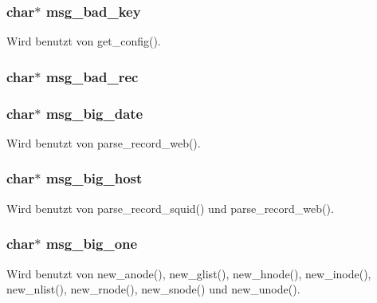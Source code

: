 \subsubsection{\setlength{\rightskip}{0pt plus 5cm}char$\ast$ {\bf msg\_\-bad\_\-key}}\label{lang_8h_677f59db55311afd2a3a860c1e36e004}




Wird benutzt von get\_\-config().
\subsubsection{\setlength{\rightskip}{0pt plus 5cm}char$\ast$ {\bf msg\_\-bad\_\-rec}}\label{lang_8h_bc0778be3e6f0173eda81a2a70e97fee}


\subsubsection{\setlength{\rightskip}{0pt plus 5cm}char$\ast$ {\bf msg\_\-big\_\-date}}\label{lang_8h_5cf2461dfbe62c32f225953b0326462c}




Wird benutzt von parse\_\-record\_\-web().
\subsubsection{\setlength{\rightskip}{0pt plus 5cm}char$\ast$ {\bf msg\_\-big\_\-host}}\label{lang_8h_6ce7f8ad0ab920f3113dff9e936dc9a5}




Wird benutzt von parse\_\-record\_\-squid() und parse\_\-record\_\-web().
\subsubsection{\setlength{\rightskip}{0pt plus 5cm}char$\ast$ {\bf msg\_\-big\_\-one}}\label{lang_8h_a2ee47975118e6f57ce4a10d1baeef26}




Wird benutzt von new\_\-anode(), new\_\-glist(), new\_\-hnode(), new\_\-inode(), new\_\-nlist(), new\_\-rnode(), new\_\-snode() und new\_\-unode().
